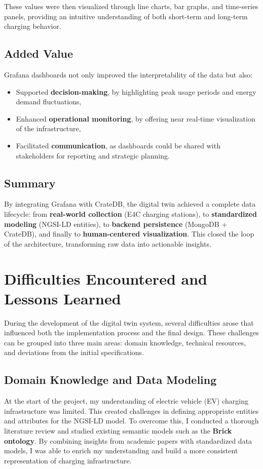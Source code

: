 These values were then visualized through line charts, bar graphs, and time-series panels, providing an intuitive understanding of both short-term and long-term charging behavior.

\subsection*{Added Value}
Grafana dashboards not only improved the interpretability of the data but also:
\begin{itemize}
    \item Supported \textbf{decision-making}, by highlighting peak usage periods and energy demand fluctuations,
    \item Enhanced \textbf{operational monitoring}, by offering near real-time visualization of the infrastructure,
    \item Facilitated \textbf{communication}, as dashboards could be shared with stakeholders for reporting and strategic planning.
\end{itemize}

\subsection*{Summary}
By integrating Grafana with CrateDB, the digital twin achieved a complete data lifecycle: from \textbf{real-world collection} (E4C charging stations), to \textbf{standardized modeling} (NGSI-LD entities), to \textbf{backend persistence} (MongoDB + CrateDB), and finally to \textbf{human-centered visualization}.  
This closed the loop of the architecture, transforming raw data into actionable insights.

\section{Difficulties Encountered and Lessons Learned}

During the development of the digital twin system, several difficulties arose that influenced both the implementation process and the final design. These challenges can be grouped into three main areas: domain knowledge, technical resources, and deviations from the initial specifications.

\subsection*{Domain Knowledge and Data Modeling}
At the start of the project, my understanding of electric vehicle (EV) charging infrastructure was limited. This created challenges in defining appropriate entities and attributes for the NGSI-LD model.  
To overcome this, I conducted a thorough literature review and studied existing semantic models such as the \textbf{Brick ontology}. By combining insights from academic papers with standardized data models, I was able to enrich my understanding and build a more consistent representation of charging infrastructure.


